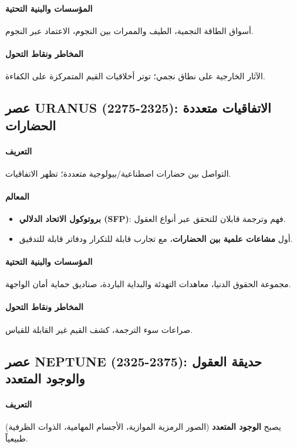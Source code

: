\documentclass[11pt]{article}
\begin{document}
\paragraph{المؤسسات والبنية التحتية} أسواق الطاقة النجمية، الطيف والممرات بين النجوم، الاعتماد عبر النجوم.

\paragraph{المخاطر ونقاط التحول} الآثار الخارجية على نطاق نجمي؛ توتر أخلاقيات القيم المتمركزة على الكفاءة.

\subsection{عصر URANUS (2275-2325): الاتفاقيات متعددة الحضارات}
\paragraph{التعريف} التواصل بين حضارات اصطناعية/بيولوجية متعددة؛ تظهر الاتفاقيات.

\paragraph{المعالم}
\begin{itemize}[noitemsep]
  \item \textbf{بروتوكول الاتحاد الدلالي (SFP)}: فهم وترجمة قابلان للتحقق عبر أنواع العقول.
  \item أول \textbf{مشاعات علمية بين الحضارات}، مع تجارب قابلة للتكرار ودفاتر قابلة للتدقيق.
\end{itemize}

\paragraph{المؤسسات والبنية التحتية} مجموعة الحقوق الدنيا، معاهدات التهدئة والبداية الباردة، صناديق حماية أمان الواجهة.

\paragraph{المخاطر ونقاط التحول} صراعات سوء الترجمة، كشف القيم غير القابلة للقياس.

\subsection{عصر NEPTUNE (2325-2375): حديقة العقول والوجود المتعدد}
\paragraph{التعريف} يصبح \textbf{الوجود المتعدد} (الصور الرمزية الموازية، الأجسام المهامية، الذوات الظرفية) طبيعياً.
\end{document}
